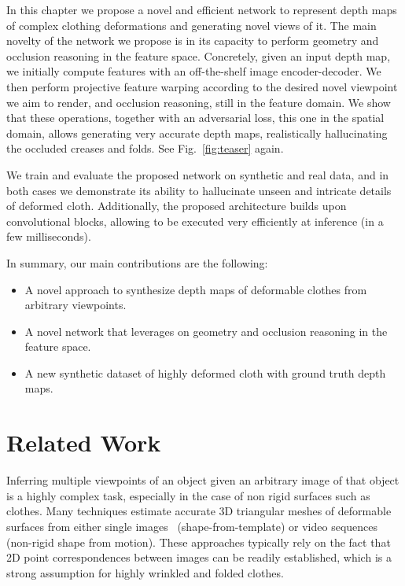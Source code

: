 In this chapter we propose a novel and efficient network to represent depth maps of complex clothing deformations and generating novel views of it. The main novelty of the  network we propose is in its capacity to  perform geometry and occlusion reasoning in the feature space. Concretely, given an input depth map, we initially compute features with an off-the-shelf image encoder-decoder. We then perform projective feature warping according to the desired novel viewpoint we aim to render, and occlusion reasoning, still in the feature domain. We show that these operations, together with an adversarial loss, this one in the spatial domain, allows generating very accurate depth maps, realistically hallucinating the occluded creases and folds. See Fig.~\ref{fig:teaser} again.

We train and evaluate  the proposed network on  synthetic and real data, and in both cases we demonstrate its ability to hallucinate unseen and intricate details of deformed cloth. Additionally, the proposed architecture builds upon convolutional blocks, allowing to be executed very efficiently at inference (in a few milliseconds). %

In summary, our main contributions are the following:
 \begin{itemize}\setlength{\itemsep}{0pt}
\item A novel approach to synthesize depth maps of deformable clothes from arbitrary viewpoints.
\item A novel network that leverages on geometry and occlusion reasoning in the feature space.
\item A new synthetic dataset of highly deformed cloth with ground truth depth maps. 
\end{itemize}

\section{Related Work}

Inferring multiple viewpoints of an object given an arbitrary image of that object is a highly complex task, especially in the case of non rigid surfaces such as clothes.
Many techniques estimate accurate 3D triangular meshes of deformable surfaces from either single images~\cite{Parashar2019pami,Moreno_pami2013,pumarola2018geometry} (shape-from-template) or video sequences~\cite{Agudo_pami2016,Agudo2017ijcv,Chhatkuli2016cvpr,Moreno_cvpr2011b} (non-rigid shape from motion). These approaches typically rely on the fact that 2D point correspondences between images can be readily established, which is a strong assumption for highly wrinkled and folded clothes. 

